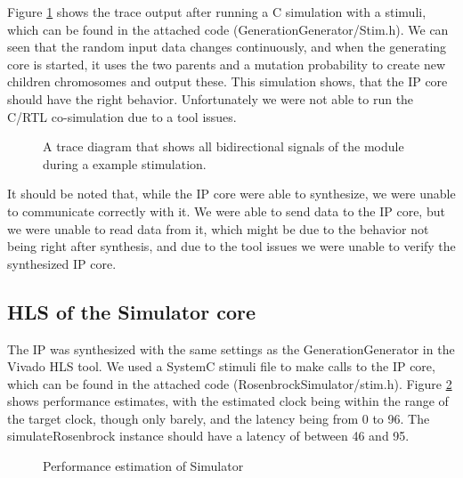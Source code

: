 Figure \ref{fig:generationgeneratortrace} shows the trace output after running a C simulation with a stimuli, which can be found in the attached code (GenerationGenerator/Stim.h). We can seen that the random input data changes continuously, and when the generating core is started, it uses the two parents and a mutation probability to create new children chromosomes and output these. This simulation shows, that the IP core should have the right behavior. Unfortunately we were not able to run the C/RTL co-simulation  due to a tool issues.

\begin{figure}[h!]
	\centering
	\caption{A trace diagram that shows all bidirectional signals of the module during a example stimulation.}
	\label{fig:generationgeneratortrace}
\end{figure}
\FloatBarrier

It should be noted that, while the IP core were able to synthesize, we were unable to communicate correctly with it. We were able to send data to the IP core, but we were unable to read data from it, which might be due to the behavior not being right after synthesis, and due to the tool issues we were unable to verify the synthesized IP core.

\subsection{HLS of the Simulator core}

The IP was synthesized with the same settings as the GenerationGenerator in the Vivado HLS tool. We used a SystemC stimuli file to make calls to the IP core, which can be found in the attached code (RosenbrockSimulator/stim.h). Figure \ref{fig:simperformanceestimates} shows performance estimates, with the estimated clock being within the range of the target clock, though only barely, and the latency being from  0 to 96. The simulateRosenbrock instance should have a latency of between 46 and 95. 

\begin{figure}[h!]
	\centering
	\caption{Performance estimation of Simulator}
	\label{fig:simperformanceestimates}
\end{figure}
\FloatBarrier

